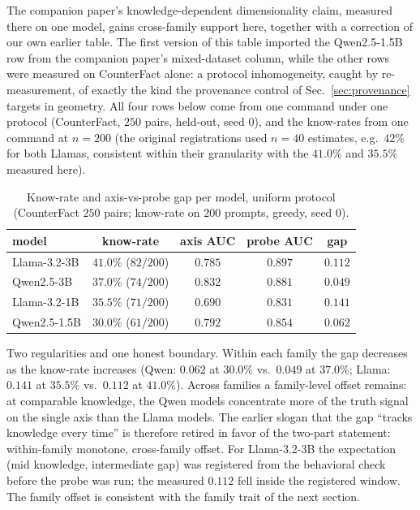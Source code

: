 \documentclass[11pt]{article}
\begin{document}
The companion paper's knowledge-dependent dimensionality claim, measured
there on one model, gains cross-family support here, together with a
correction of our own earlier table. The first version of this table
imported the Qwen2.5-1.5B row from the companion paper's mixed-dataset
column, while the other rows were measured on CounterFact alone: a
protocol inhomogeneity, caught by re-measurement, of exactly the kind the
provenance control of Sec.~\ref{sec:provenance} targets in geometry. All
four rows below come from one command under one protocol (CounterFact,
$250$ pairs, held-out, seed $0$), and the know-rates from one command at
$n{=}200$ (the original registrations used $n{=}40$ estimates, e.g.\
$42\%$ for both Llamas, consistent within their granularity with the
$41.0\%$ and $35.5\%$ measured here).

\begin{table}[H]
\centering
\caption{Know-rate and axis-vs-probe gap per model, uniform protocol
(CounterFact $250$ pairs; know-rate on $200$ prompts, greedy, seed $0$).}
\label{tab:knowgap}
\begin{tabular}{lcccc}
\toprule
model & know-rate & axis AUC & probe AUC & gap \\
\midrule
Llama-3.2-3B & $41.0\%$ ($82/200$) & $0.785$ & $0.897$ & $0.112$ \\
Qwen2.5-3B   & $37.0\%$ ($74/200$) & $0.832$ & $0.881$ & $0.049$ \\
Llama-3.2-1B & $35.5\%$ ($71/200$) & $0.690$ & $0.831$ & $0.141$ \\
Qwen2.5-1.5B & $30.0\%$ ($61/200$) & $0.792$ & $0.854$ & $0.062$ \\
\bottomrule
\end{tabular}
\end{table}

Two regularities and one honest boundary. Within each family the gap
decreases as the know-rate increases (Qwen: $0.062$ at $30.0\%$ vs.\
$0.049$ at $37.0\%$; Llama: $0.141$ at $35.5\%$ vs.\ $0.112$ at $41.0\%$).
Across families a family-level offset remains: at comparable knowledge, the
Qwen models concentrate more of the truth signal on the single axis than
the Llama models. The earlier slogan that the gap ``tracks knowledge every
time'' is therefore retired in favor of the two-part statement:
within-family monotone, cross-family offset. For Llama-3.2-3B the
expectation (mid knowledge, intermediate gap) was registered from the
behavioral check before the probe was run; the measured $0.112$ fell inside
the registered window. The family offset is consistent with the family
trait of the next section.
\end{document}
